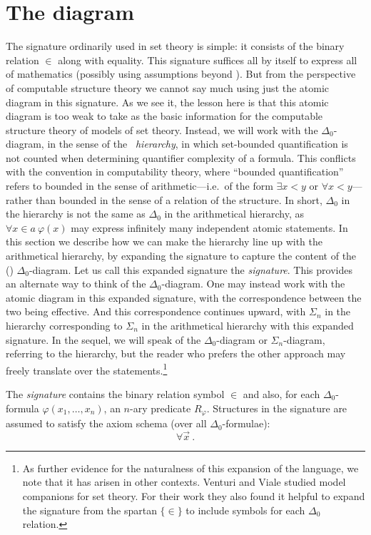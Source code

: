 \documentclass{amsart}
\begin{document}
\section{The \Levy{} diagram}\label{Section.The-Levy-Diagram}
The signature ordinarily used in set theory is simple: it consists of the binary relation $\in$ along with equality. This
signature suffices all by itself to express all of mathematics (possibly using assumptions beyond \ZFC). But from the perspective of computable structure theory we cannot say much using just the atomic diagram in this signature. As we see it, the lesson here is that this atomic diagram is too weak to take as the basic information for the computable structure theory of models of set theory. Instead, we will work with the $\Delta_0$-diagram, in the sense of the \emph{\Levy\ hierarchy}, in which set-bounded quantification is not counted when determining quantifier complexity of a formula.
This conflicts with the convention in computability theory, where ``bounded quantification'' refers to bounded in the sense of arithmetic---i.e.\ of the form $\exists x<y$ or $\forall x<y$---rather than bounded in the sense of a relation of the structure. In short, $\Delta_0$ in the \Levy{} hierarchy is not the same as $\Delta_0$ in the arithmetical hierarchy, as $\forall x\in a\ \varphi(x)$ may express infinitely many independent atomic statements.
In this section we describe how we can make the \Levy{} hierarchy line up with the arithmetical hierarchy, by
expanding the signature to capture the content of the (\Levy) $\Delta_0$-diagram. Let us call this expanded signature the \emph{\Levy{} signature}. This provides an alternate way to think of the $\Delta_0$-diagram. One may instead work with the atomic diagram in this expanded signature, with the correspondence between the two being effective. And this correspondence continues upward, with $\Sigma_n$ in the \Levy{} hierarchy corresponding to $\Sigma_n$ in the arithmetical hierarchy with this expanded signature. In the sequel, we will speak of the $\Delta_0$-diagram or $\Sigma_n$-diagram, referring to the \Levy{} hierarchy, but the reader who prefers the other approach may freely translate over the statements.\footnote{As further evidence for the naturalness of this expansion of the language, we note that it has arisen in other contexts. Venturi and Viale \cite{Venture-Viale:submitted} studied model companions for set theory. For their work they also found it helpful to expand the signature from the spartan $\{\in\}$ to include symbols for each $\Delta_0$ relation.}
\begin{definition}\label{Definition.Levy.signature}
The \emph{\Levy{} signature} contains the binary relation symbol $\in$ and also, for each $\Delta_0$-formula $\varphi(x_1,\ldots,x_n)$, an $n$-ary predicate $R_{\varphi}$.
Structures in the \Levy{} signature are assumed to satisfy the axiom schema (over all $\Delta_0$-formulae):
$$ \forall \vec x\ .$$
\end{definition}
\end{document}
